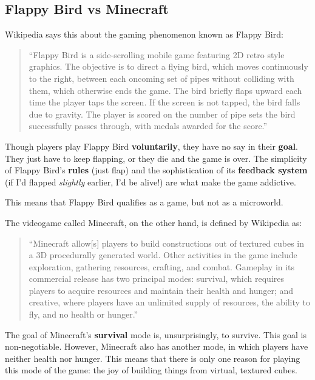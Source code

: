 \subsection{Flappy Bird vs Minecraft}

Wikipedia says this about the gaming phenomenon known as Flappy Bird:

\begin{quote}
``Flappy Bird is a side-scrolling mobile game featuring 2D retro style
graphics. The objective is to direct a flying bird, which moves
continuously to the right, between each oncoming set of pipes without
colliding with them, which otherwise ends the game. The bird briefly
flaps upward each time the player taps the screen. If the screen is not
tapped, the bird falls due to gravity. The player is scored on the
number of pipe sets the bird successfully passes through, with medals
awarded for the score.''\cite{wiki:flappy}
\end{quote}

Though players play Flappy Bird \textbf{voluntarily}, they have no say
in their \textbf{goal}. They just have to keep flapping, or they die and
the game is over. The simplicity of Flappy Bird's \textbf{rules} (just
flap) and the sophistication of its \textbf{feedback system} (if I'd
flapped \emph{slightly} earlier, I'd be alive!) are what make the game
addictive\cite{forbes:flappy}.

This means that Flappy Bird qualifies as a game, but not as a
microworld.

The videogame called Minecraft, on the other hand, is defined by Wikipedia as:

\begin{quote}
``Minecraft allow[s] players to build constructions out of textured
cubes in a 3D procedurally generated world. Other activities in the game
include exploration, gathering resources, crafting, and combat. Gameplay
in its commercial release has two principal modes: survival, which
requires players to acquire resources and maintain their health and
hunger; and creative, where players have an unlimited supply of
resources, the ability to fly, and no health or hunger.''\cite{wiki:minecraft}
\end{quote}

The goal of Minecraft's \textbf{survival} mode is, unsurprisingly, to
survive. This goal is non-negotiable. However, Minecraft also has
another mode, in which players have neither health nor hunger. This
means that there is only one reason for playing this mode of the game:
the joy of building things from virtual, textured cubes.

